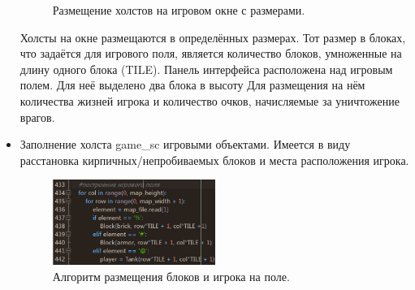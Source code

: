 \begin{itemize}
\begin{figure}[H]
    \caption{\centering\label{fig:example05}Размещение холстов на игровом окне с размерами.}
\end{figure}

Холсты на окне размещаются в определённых размерах. Тот размер в блоках, что задаётся для игрового поля, является количество блоков, умноженные на длину одного блока (TILE). Панель интерфейса  расположена над игровым полем. Для неё выделено два блока в высоту Для размещения на нём количества жизней игрока и количество очков, начисляемые за уничтожение врагов. 
\item Заполнение холста game\_sc игровыми объектами. Имеется в виду расстановка кирпичных/непробиваемых блоков и места расположения игрока.

\begin{figure}[H]
    \centering
    \includegraphics[width=0.5\textwidth]{./images/image2.png}
    \caption{\centering\label{fig:example05}Алгоритм размещения блоков и игрока на поле.}
\end{figure}


\end{itemize}
